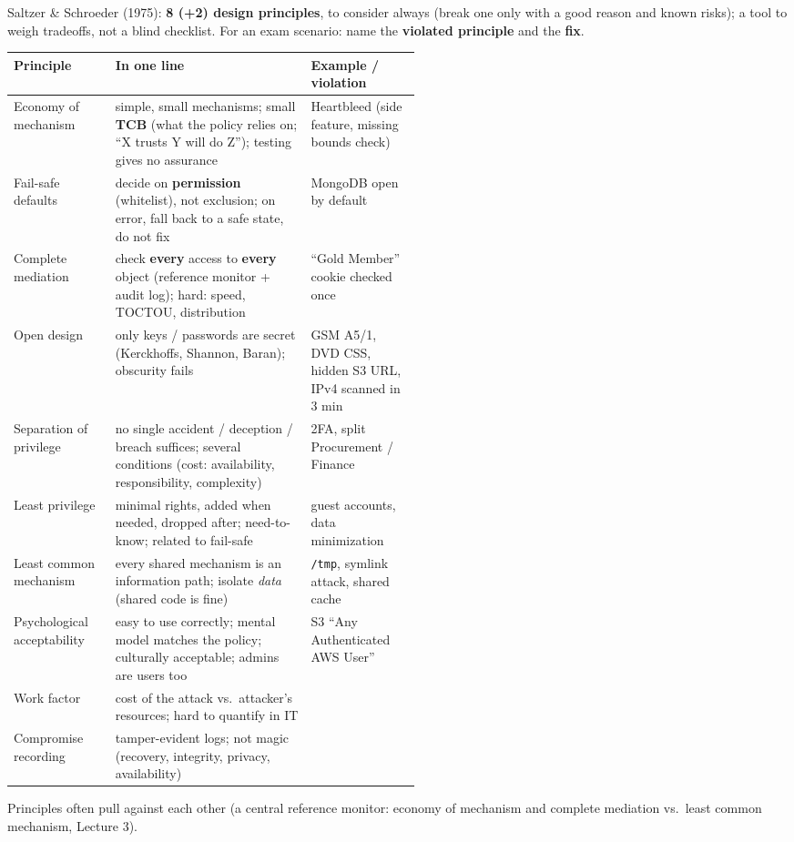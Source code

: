 \begin{recapbox}[title={Exam-ready recap --- Lecture 2: Principles}]
Saltzer \& Schroeder (1975): \textbf{8 (+2) design principles}, to consider always (break one only
with a good reason and known risks); a tool to weigh tradeoffs, not a blind checklist. For an
exam scenario: name the \textbf{violated principle} and the \textbf{fix}.
\begin{center}
\small
\begin{tabularx}{\linewidth}{@{}>{\raggedright\arraybackslash}p{0.25\linewidth} >{\raggedright\arraybackslash}X >{\raggedright\arraybackslash}p{0.27\linewidth}@{}}
\toprule
\textbf{Principle} & \textbf{In one line} & \textbf{Example / violation} \\
\midrule
1 Economy of mechanism & simple, small mechanisms; small \textbf{TCB} (what the policy relies on; ``X trusts Y will do Z''); testing gives no assurance & Heartbleed (side feature, missing bounds check) \\
2 Fail-safe defaults & decide on \textbf{permission} (whitelist), not exclusion; on error, fall back to a safe state, do not fix & MongoDB open by default \\
3 Complete mediation & check \textbf{every} access to \textbf{every} object (reference monitor + audit log); hard: speed, TOCTOU, distribution & ``Gold Member'' cookie checked once \\
4 Open design & only keys / passwords are secret (Kerckhoffs, Shannon, Baran); obscurity fails & GSM A5/1, DVD CSS, hidden S3 URL, IPv4 scanned in 3 min \\
5 Separation of privilege & no single accident / deception / breach suffices; several conditions (cost: availability, responsibility, complexity) & 2FA, split Procurement / Finance \\
6 Least privilege & minimal rights, added when needed, dropped after; need-to-know; related to fail-safe & guest accounts, data minimization \\
7 Least common mechanism & every shared mechanism is an information path; isolate \emph{data} (shared code is fine) & \texttt{/tmp}, symlink attack, shared cache \\
8 Psychological acceptability & easy to use correctly; mental model matches the policy; culturally acceptable; admins are users too & S3 ``Any Authenticated AWS User'' \\
9 Work factor & cost of the attack vs.\ attacker's resources; hard to quantify in IT & \\
10 Compromise recording & tamper-evident logs; not magic (recovery, integrity, privacy, availability) & \\
\bottomrule
\end{tabularx}
\end{center}
Principles often pull against each other (a central reference monitor: economy of mechanism and
complete mediation vs.\ least common mechanism, Lecture 3).


\end{recapbox}
